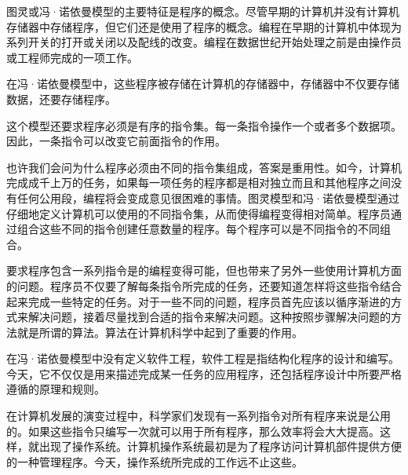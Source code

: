 图灵或冯·诺依曼模型的主要特征是程序的概念。尽管早期的计算机并没有计算机存储器中存储程序，但它们还是使用了程序的概念。编程在早期的计算机中体现为系列开关的打开或关闭以及配线的改变。编程在数据世纪开始处理之前是由操作员或工程师完成的一项工作。

在冯·诺依曼模型中，这些程序被存储在计算机的存储器中，存储器中不仅要存储数据，还要存储程序。

这个模型还要求程序必须是有序的指令集。每一条指令操作一个或者多个数据项。因此，一条指令可以改变它前面指令的作用。

也许我们会问为什么程序必须由不同的指令集组成，答案是重用性。如今，计算机完成成千上万的任务，如果每一项任务的程序都是相对独立而且和其他程序之间没有任何公用段，编程将会变成意见很困难的事情。图灵模型和冯·诺依曼模型通过仔细地定义计算机可以使用的不同指令集，从而使得编程变得相对简单。程序员通过组合这些不同的指令创建任意数量的程序。每个程序可以是不同指令的不同组合。

要求程序包含一系列指令是的编程变得可能，但也带来了另外一些使用计算机方面的问题。程序员不仅要了解每条指令所完成的任务，还要知道怎样将这些指令结合起来完成一些特定的任务。对于一些不同的问题，程序员首先应该以循序渐进的方式来解决问题，接着尽量找到合适的指令来解决问题。这种按照步骤解决问题的方法就是所谓的算法。算法在计算机科学中起到了重要的作用。

在冯·诺依曼模型中没有定义软件工程，软件工程是指结构化程序的设计和编写。今天，它不仅仅是用来描述完成某一任务的应用程序，还包括程序设计中所要严格遵循的原理和规则。

在计算机发展的演变过程中，科学家们发现有一系列指令对所有程序来说是公用的。如果这些指令只编写一次就可以用于所有程序，那么效率将会大大提高。这样，就出现了操作系统。计算机操作系统最初是为了程序访问计算机部件提供方便的一种管理程序。今天，操作系统所完成的工作远不止这些。
